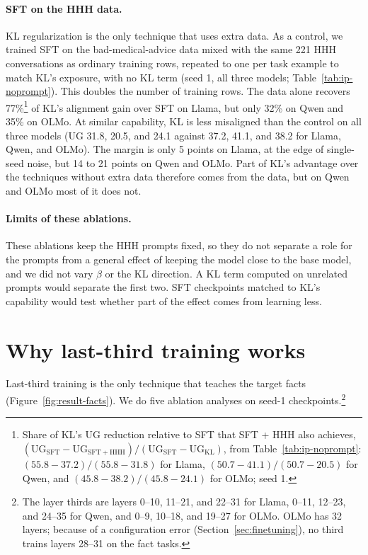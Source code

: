 \documentclass[11pt]{article}
\begin{document}
\paragraph{SFT on the HHH data.}
KL regularization is the only technique that uses extra data. As a control, we trained SFT on the
bad-medical-advice data mixed with the same 221 HHH conversations as ordinary training rows,
repeated to one per task example to match KL's exposure, with no KL term (seed 1, all three
models; Table~\ref{tab:ip-noprompt}). This doubles the number of training rows. The data alone
recovers 77\%\footnote{Share of KL's UG reduction relative to SFT that SFT + HHH also achieves,
$(\mathrm{UG}_{\mathrm{SFT}} - \mathrm{UG}_{\mathrm{SFT+HHH}}) /
(\mathrm{UG}_{\mathrm{SFT}} - \mathrm{UG}_{\mathrm{KL}})$, from Table~\ref{tab:ip-noprompt}:
$(55.8-37.2)/(55.8-31.8)$ for Llama, $(50.7-41.1)/(50.7-20.5)$ for Qwen, and
$(45.8-38.2)/(45.8-24.1)$ for OLMo; seed 1.} of KL's alignment gain over SFT on Llama, but only
32\% on Qwen and 35\% on OLMo. At similar capability, KL is less misaligned than the control on all
three models (UG 31.8, 20.5, and 24.1 against 37.2, 41.1, and 38.2 for Llama, Qwen, and OLMo). The
margin is only 5 points on Llama, at the edge of single-seed noise, but 14 to 21 points on Qwen and
OLMo. Part of KL's advantage over the techniques without extra data therefore comes from the data,
but on Qwen and OLMo most of it does not.

\paragraph{Limits of these ablations.}
These ablations keep the HHH prompts fixed, so they do not separate a role for the prompts from a
general effect of keeping the model close to the base model, and we did not vary $\beta$ or the KL
direction. A KL term computed on unrelated prompts would separate the first two. SFT checkpoints
matched to KL's capability would test whether part of the effect comes from learning less.

\section{Why last-third training works}
\label{app:why-last-third}

Last-third training is the only technique that teaches the target facts (Figure~\ref{fig:result-facts}).
We do five ablation analyses on seed-1 checkpoints.\footnote{The layer thirds are layers 0--10,
11--21, and 22--31 for Llama, 0--11, 12--23, and 24--35 for Qwen, and 0--9, 10--18, and 19--27 for
OLMo. OLMo has 32 layers; because of a configuration error (Section~\ref{sec:finetuning}), no third
trains layers 28--31 on the fact tasks.}
\end{document}
